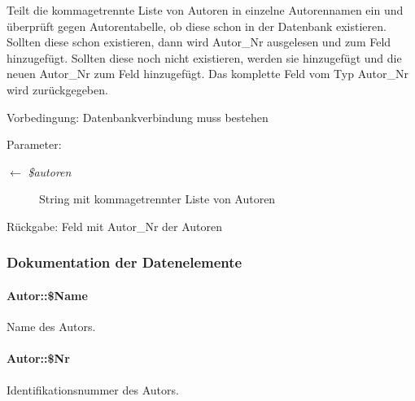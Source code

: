 Teilt die kommagetrennte Liste von Autoren in einzelne Autorennamen ein und überprüft gegen Autorentabelle, ob diese schon in der Datenbank existieren. Sollten diese schon existieren, dann wird Autor\_\-Nr ausgelesen und zum Feld hinzugefügt. Sollten diese noch nicht existieren, werden sie hinzugefügt und die neuen Autor\_\-Nr zum Feld hinzugefügt. Das komplette Feld vom Typ Autor\_\-Nr wird zurückgegeben. \begin{Desc}
\item[Vorbedingung:]Datenbankverbindung muss bestehen \end{Desc}
\begin{Desc}
\item[Parameter:]
\begin{description}
\item[\mbox{$\leftarrow$} {\em \$autoren}]String mit kommagetrennter Liste von Autoren \end{description}
\end{Desc}
\begin{Desc}
\item[R\"{u}ckgabe:]Feld mit Autor\_\-Nr der Autoren \end{Desc}


\subsubsection{Dokumentation der Datenelemente}
\hypertarget{classAutor_8602b5705cef83e7c16f4040f9add56d}{
\paragraph[\$Name]{\setlength{\rightskip}{0pt plus 5cm}Autor::\$Name}\hfill}
\label{classAutor_8602b5705cef83e7c16f4040f9add56d}


Name des Autors. 

\hypertarget{classAutor_23e64634d5dc31b41b7ee9c49b9ea6b9}{
\paragraph[\$Nr]{\setlength{\rightskip}{0pt plus 5cm}Autor::\$Nr}\hfill}
\label{classAutor_23e64634d5dc31b41b7ee9c49b9ea6b9}


Identifikationsnummer des Autors. 


